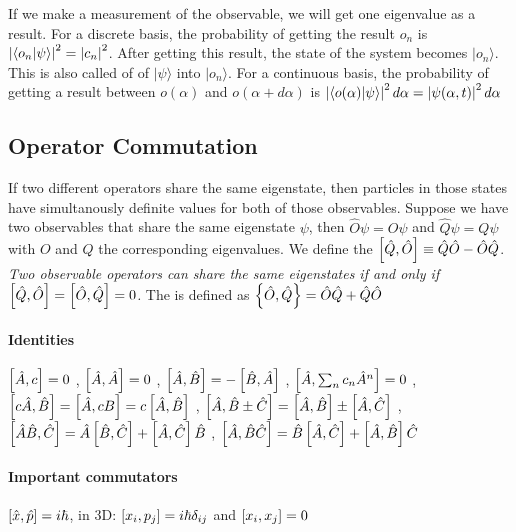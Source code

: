 
If we make a measurement of the observable, we will get one eigenvalue as a result.
For a discrete basis, the probability of getting the result $o_n$ is
$\left\vert \langle o_n | \psi \rangle \right\vert^2 = \left\vert c_n \right\vert^2$.
After getting this result, the state of the system becomes $| o_n \rangle$.
This is also called  of  of $| \psi \rangle$
into $| o_n \rangle$.
For a continuous basis, the probability of getting a result between $o(\alpha)$
and $o(\alpha + d \alpha)$ is $\left\vert \langle o(\alpha) | \psi \rangle \right\vert^2 d \alpha
= \left\vert \psi(\alpha,t) \right\vert^2 d \alpha$

\subsection{Operator Commutation}
If two different operators share the same eigenstate, then particles in those states
have simultanously definite values for both of those observables.
Suppose we have two observables that share the same eigenstate $\psi$, then
$\hat{O} \psi = O \psi$ and $\hat{Q} \psi = Q \psi$ with $O$ and $Q$ the corresponding
eigenvalues. We define the  $\left[ \hat{Q},\hat{O} \right] \equiv
\hat{Q} \hat{O} - \hat{O} \hat{Q}$. \textit{Two observable operators can share the
same eigenstates if and only if $\left[ \hat{Q},\hat{O} \right] =
\left[ \hat{O},\hat{Q} \right] = 0$.}
The  is defined as
$\left\{ \hat{O},\hat{Q} \right\} = \hat{O} \hat{Q} + \hat{Q} \hat{O}$

\paragraph{Identities}
$\left[ \hat{A},c \right] = 0$ , $\left[ \hat{A},\hat{A} \right] = 0$ ,
$\left[ \hat{A},\hat{B} \right] = - \left[ \hat{B},\hat{A} \right]$ ,
$\left[ \hat{A},\sum_n c_n \hat{A}^n \right] = 0$ ,
$\left[ c \hat{A},\hat{B} \right] = \left[ \hat{A},c B \right] = c \left[ \hat{A},\hat{B} \right]$ ,
$\left[ \hat{A},\hat{B} \pm \hat{C} \right] = \left[ \hat{A},\hat{B} \right] \pm \left[ \hat{A},\hat{C} \right]$ ,
$\left[ \hat{A} \hat{B} , \hat{C} \right] = \hat{A} \left[ \hat{B},\hat{C} \right] + \left[ \hat{A},\hat{C} \right] \hat{B}$ ,
$\left[ \hat{A} , \hat{B} \hat{C} \right] = \hat{B} \left[ \hat{A},\hat{C} \right] + \left[ \hat{A},\hat{B} \right] \hat{C}$

\paragraph{Important commutators}
$\left[ \hat{x},\hat{p} \right] = i \hbar$, in 3D: $\left[ x_i,p_j \right] = i \hbar \delta_{ij}$
and $\left[ x_i,x_j \right] = 0$

